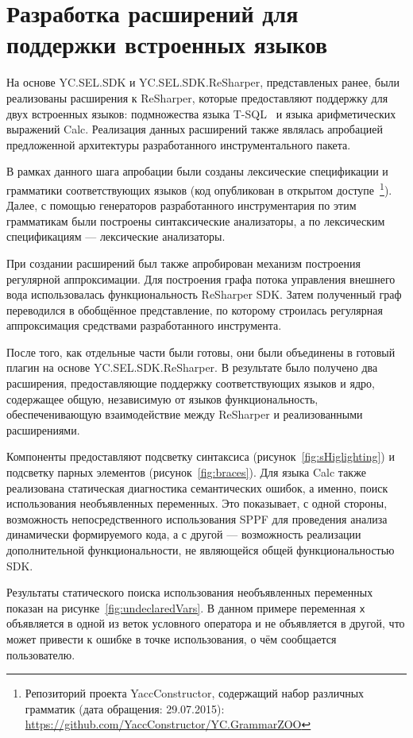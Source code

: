 \section{Разработка расширений для поддержки встроенных языков}

На основе YC.SEL.SDK и YC.SEL.SDK.ReSharper, представленых ранее, были реализованы расширения к ReSharper, которые предоставляют поддержку для  двух встроенных языков: подмножества языка T-SQL~\cite{TSQL} и языка арифметических выражений Calc. Реализация данных расширений также являлась апробацией предложенной архитектуры разработанного инструментального пакета.

В рамках данного шага апробации были созданы лексические спецификации и грамматики соответствующих языков (код опубликован в открытом доступе~\footnote{Репозиторий проекта YaccConstructor, содержащий набор различных грамматик (дата обращения: 29.07.2015): \url{https://github.com/YaccConstructor/YC.GrammarZOO}}). Далее, с помощью генераторов разработанного инструментария по этим грамматикам были построены синтаксические анализаторы, а по лексическим спецификациям --- лексические анализаторы.

При создании расширений был также апробирован механизм построения регулярной аппроксимации. Для построения графа потока управления внешнего вода использовалась функциональность ReSharper SDK. Затем полученный граф переводился в обобщённое представление, по которому строилась регулярная аппроксимация средствами разработанного инструмента.

После того, как отдельные части были готовы, они были объединены в готовый плагин на основе YC.SEL.SDK.ReSharper. В результате было получено два расширения, предоставляющие поддержку соответствующих языков и ядро, содержащее общую, независимую от языков функциональность, обеспеченивающую взаимодействие между ReSharper и реализованными расширениями.

Компоненты предоставляют подсветку синтаксиса (рисунок~\ref{fig:sHiglighting}) и подсветку парных элементов (рисунок~\ref{fig:braces}). Для языка Calc также реализована статическая диагностика семантических ошибок, а именно, поиск использования необъявленных переменных. Это показывает, с одной стороны, возможность непосредственного использования SPPF для проведения анализа динамически формируемого кода, а с другой --- возможность реализации дополнительной функциональности, не являющейся общей функциональностью SDK.

Результаты статического поиска использования необъявленных переменных показан на 
рисунке~\ref{fig:undeclaredVars}. В данном примере переменная \verb|x| объявляется в одной из веток условного оператора и не объявляется в другой, что может привести к ошибке в точке использования, о чём сообщается пользователю.

